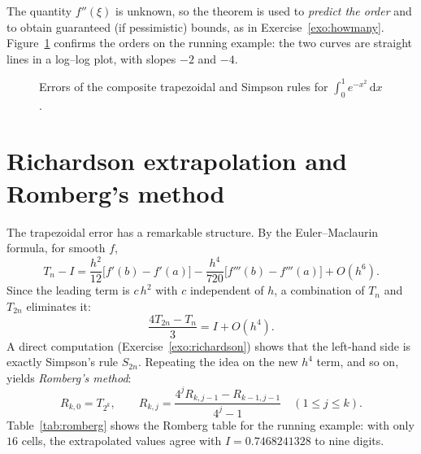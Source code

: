 \documentclass[11pt,a4paper,twoside,openright]{book}
\newcommand{\dd}{\,\mathrm{d}}
\newcounter{exo}[chapter]
\begin{document}
The quantity $f''(\xi)$ is unknown, so the theorem is used to \emph{predict the order} and to obtain guaranteed (if pessimistic) bounds, as in Exercise~\ref{exo:howmany}.
Figure~\ref{fig:conv} confirms the orders on the running example: the two curves are straight lines in a log--log plot, with slopes $-2$ and $-4$.

\begin{figure}[htbp]
  \centering
  \caption{Errors of the composite trapezoidal and Simpson rules for $\int_0^1 e^{-x^{2}}\dd x$.}
  \label{fig:conv}
\end{figure}

\section{Richardson extrapolation and Romberg's method}
The trapezoidal error has a remarkable structure.
By the Euler--Maclaurin formula, for smooth $f$,
\begin{equation}
  T_n-I=\frac{h^{2}}{12}\bigl[f'(b)-f'(a)\bigr]-\frac{h^{4}}{720}\bigl[f'''(b)-f'''(a)\bigr]+O(h^{6}).
  \label{eq:eulermaclaurin}
\end{equation}
Since the leading term is $c\,h^{2}$ with $c$ independent of $h$, a combination of $T_n$ and $T_{2n}$ eliminates it:
\begin{equation}
  \frac{4T_{2n}-T_n}{3}=I+O(h^{4}).
  \label{eq:richardson}
\end{equation}
A direct computation (Exercise~\ref{exo:richardson}) shows that the left-hand side is exactly Simpson's rule $S_{2n}$.
Repeating the idea on the new $h^{4}$ term, and so on, yields \emph{Romberg's method}:
\[
  R_{k,0}=T_{2^{k}},\qquad
  R_{k,j}=\frac{4^{j}R_{k,j-1}-R_{k-1,j-1}}{4^{j}-1}\quad(1\le j\le k).
\]
Table~\ref{tab:romberg} shows the Romberg table for the running example: with only $16$ cells, the extrapolated values agree with $I=0.7468241328$ to nine digits.
\end{document}
